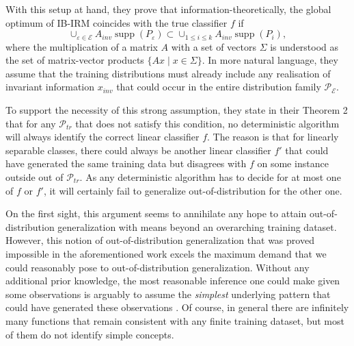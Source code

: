 With this setup at hand, they prove that information-theoretically, the global optimum of IB-IRM coincides with the true classifier $f$ if 
\begin{equation}
	\label{eq:ib-irm-support-overlap-condition}
	\cup_{\varepsilon \in \mathcal{E}}A_{inv} \operatorname{supp}(P_\varepsilon) \subset \cup_{1\leq i \leq k} A_{inv}\operatorname{supp}(P_i),
\end{equation}
where the multiplication of a matrix $A$ with a set of vectors $\Sigma$ is understood as the set of matrix-vector products $\{A x \mid x\in\Sigma\}$.
In more natural language, they assume that the training distributions must already include any realisation of invariant information $x_{inv}$ that could occur in the entire distribution family $\mathcal{P}_\mathcal{E}$.

To support the necessity of this strong assumption, they state in their Theorem 2 that for any $\mathcal{P}_{tr}$ that does not satisfy this condition, no deterministic algorithm will always identify the correct linear classifier $f$. 
The reason is that for linearly separable classes, there could always be another linear classifier $f'$ that could have generated the same training data but disagrees with $f$ on some instance outside out of $\mathcal{P}_{tr}$.
As any deterministic algorithm has to decide for at most one of $f$ or $f'$, it will certainly fail to generalize out-of-distribution for the other one.

On the first sight, this argument seems to annihilate any hope to attain out-of-distribution generalization with means beyond an overarching training dataset.
However, this notion of out-of-distribution generalization that was proved impossible in the aforementioned work excels the maximum demand that we could reasonably pose to out-of-distribution generalization.
Without any additional prior knowledge, the most reasonable inference one could make given some observations is arguably to assume the \textit{simplest} underlying pattern that could have generated these observations \cite{solomonoff1964formal}.
Of course, in general there are infinitely many functions that remain consistent with any finite training dataset, but most of them do not identify simple concepts.


